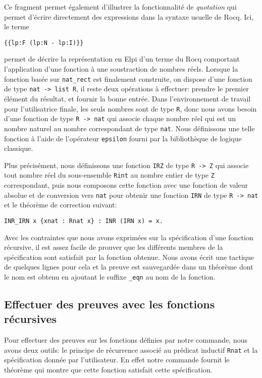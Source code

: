 \documentclass[draft]{jflart}
\begin{document}
Ce fragment permet également d'illustrer la fonctionnalité de {\em
  quotation} qui permet d'écrire directement des expressions dans la
syntaxe usuelle de Rocq.  Ici, le terme
\begin{center}
\texttt{\{\{lp:F (lp:N -  lp:I)\}\}}
\end{center}
permet de décrire la représentation en Elpi d'un terme du
Rocq comportant l'application d'une fonction à une soustraction de
nombres réels.
Lorsque la fonction basée sur \texttt{nat\_rect} est finalement
construite, on dispose d'une fonction de type \texttt{nat -> list R}, il
reste deux opérations à effectuer: prendre le premier élément du
résultat, et fournir la bonne entrée.  Dans l'environnement de travail
pour l'utilisatrice finale, les seuls nombres sont de type \texttt{R},
donc nous avons besoin d'une fonction de type \texttt{R -> nat} qui
associe chaque nombre réel qui est un nombre naturel au nombre
correspondant de type \texttt{nat}.  Nous définissons une telle fonction
à l'aide de l'opérateur \texttt{epsilon} fourni par la bibliothèque de
logique classique.

Plus précisément, nous définissons une fonction \texttt{IRZ} de type
\texttt{R -> Z} qui associe tout nombre réel du sous-ensemble \texttt{Rint}
au nombre entier de type \texttt{Z} correspondant, puis nous composons
cette fonction avec une fonction de valeur absolue et de conversion
vers \texttt{nat} pour obtenir une fonction \texttt{IRN} de type \texttt{R ->
  nat} et le théorème de correction suivant:
\begin{verbatim}
INR_IRN x {xnat : Rnat x} : INR (IRN x) = x.
\end{verbatim}

Avec les contraintes que nous avons exprimées sur la spécification
d'une fonction récursive, il est assez facile de prouver que les
différents membres de la spécification sont satisfait par la fonction
obtenue.  Nous avons écrit une tactique de quelques lignes pour cela
et la preuve est sauvegardée dans un théorème dont le nom est obtenu
en ajoutant le suffixe \texttt{\_eqn} au nom de la fonction.

\subsection{Effectuer des preuves avec les fonctions récursives}
Pour effectuer des preuves sur les fonctions définies par notre
commande, nous avons deux outils: le principe de récurrence associé au
prédicat inductif \texttt{Rnat} et la spécification donnée par
l'utilisateur.  En effet notre commande fournit le théorème qui montre
que cette fonction satisfait cette spécification.
\end{document}
